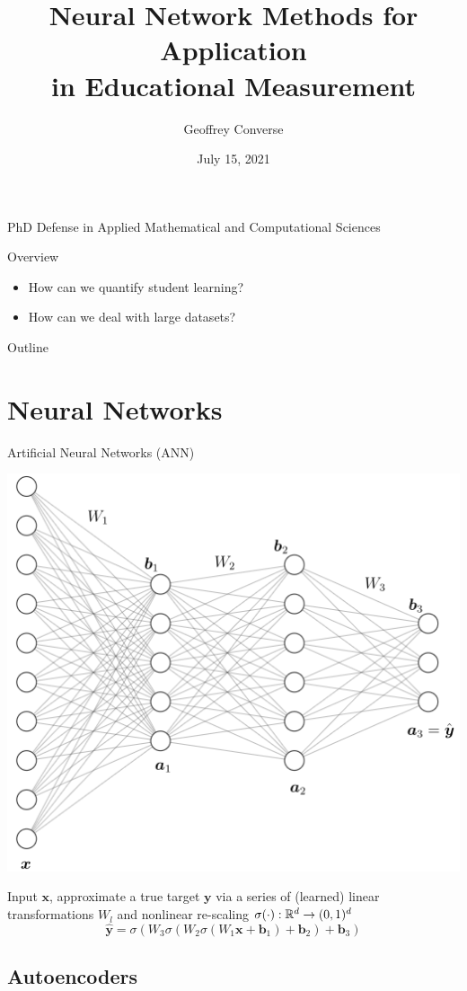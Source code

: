 \documentclass{beamer}
\title[Neural Network Methods for Application in Educational Measurement]{Neural Network Methods for Application \\ in Educational Measurement}
\author{Geoffrey Converse}
\institute{University of Iowa}
\date{July 15, 2021}
\def \R{\ensuremath \mathbb{R}}
\newcommand{\vect}[1]{\boldsymbol{#1}}
\theoremstyle{definition}
\begin{document}
\begin{frame}
  \titlepage
  \begin{center}
  {\scriptsize PhD Defense in Applied Mathematical and Computational Sciences}
  \end{center}
\end{frame}

\begin{frame}{Overview}
  \begin{itemize}
    \item How can we quantify student learning?
    \item How can we deal with large datasets?
  \end{itemize}
\end{frame}

\begin{frame}{Outline}
  \scriptsize
  \tableofcontents
\end{frame}

\section{Neural Networks}

\begin{frame}{Artificial Neural Networks (ANN)}
\begin{center}
  \includegraphics[width=.55\textwidth]{../img/ffn_visual.png}
\end{center}
\scriptsize{Input $\vect x$, approximate a true target $\vect y$ via a series of (learned) linear transformations $W_l$ and nonlinear re-scaling $\sigma(\cdot) : \R^d \to (0,1)^d$}
\[\hat{\vect y} = \sigma(W_3\sigma(W_2\sigma(W_1 \vect x + \vect b_1) + \vect b_2) + \vect b_3)\]
\end{frame}

\subsection{Autoencoders}
\end{document}
